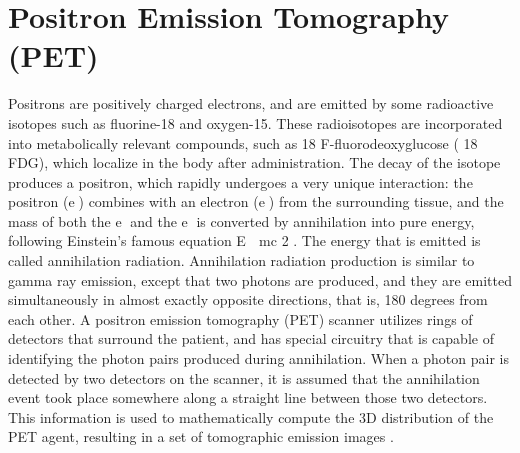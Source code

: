 \chapter{Positron Emission Tomography (PET)}

Positrons are positively charged electrons, and are emitted by some radioactive
isotopes such as fluorine-18 and oxygen-15. These radioisotopes are incorporated
into metabolically relevant compounds, such as 18 F-fluorodeoxyglucose ( 18 FDG),
which localize in the body after administration. The decay of the isotope produces
a positron, which rapidly undergoes a very unique interaction: the positron (e)
combines with an electron (e) from the surrounding tissue, and the mass of both
the e and the e is converted by annihilation into pure energy, following Einstein’s
famous equation E  mc 2 . The energy that is emitted is called annihilation radiation.
Annihilation radiation production is similar to gamma ray emission, except that
two photons are produced, and they are emitted simultaneously in almost exactly
opposite directions, that is, 180 degrees from each other. A positron emission
tomography (PET) scanner utilizes rings of detectors that surround the patient, and
has special circuitry that is capable of identifying the photon pairs produced during
annihilation. When a photon pair is detected by two detectors on the scanner, it
is assumed that the annihilation event took place somewhere along a straight line
between those two detectors. This information is used to mathematically compute
the 3D distribution of the PET agent, resulting in a set of tomographic emission
images \cite{bushberg2011essential}. 